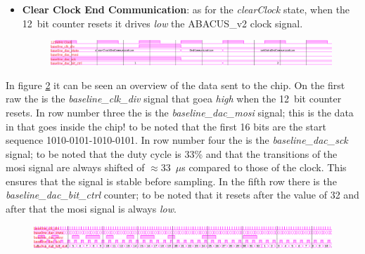 \begin{itemize}
	\item \textbf{Clear Clock End Communication}: as for the \textit{clearClock} state, when the 12~bit counter resets it drives \textit{low} the ABACUS\_v2 clock signal.
	\begin{figure}[H]
		\centering
		\includegraphics[width=1.0\linewidth]{IMG/ch4/DACsimulations/FSMclearclockendcommunication}
		\caption{}
		\label{fig:fsmclearclockendcommunication}
	\end{figure}	
\end{itemize}

\noindent In figure \ref{fig:fsmalmostall} it can be seen an overview of the data sent to the chip. On the first raw the is the \textit{baseline\_clk\_div} signal that goea \textit{high} when the 12~bit counter resets. In row number three the is the \textit{baseline\_dac\_mosi} signal; this is the data in that goes inside the chip! to be noted that the first 16 bits are the start sequence 1010-0101-1010-0101. In row number four the is the \textit{baseline\_dac\_sck} signal; to be noted that the duty cycle is 33\% and that the transitions of the mosi signal are always shifted of $\approx$33~$\mu$s compared to those of the clock.
This ensures that the signal is stable before sampling.
In the fifth row there is the \textit{baseline\_dac\_bit\_ctrl} counter; to be noted that it resets after the value of 32 and after that the mosi signal is always \textit{low}.   
\begin{figure}[H]
	\centering
	\includegraphics[width=1.0\linewidth]{IMG/ch4/DACsimulations/FSMalmostall}
	\caption{}
	\label{fig:fsmalmostall}
\end{figure}
